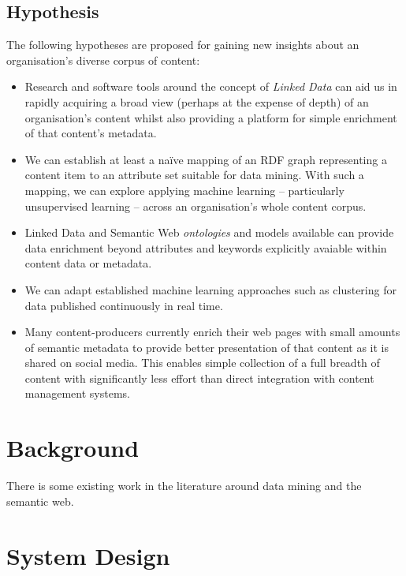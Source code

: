 \documentclass[10pt,a4paper]{report}
\begin{document}
\section{Hypothesis}

The following hypotheses are proposed for gaining new insights about an
organisation's diverse corpus of content:

\begin{itemize}

\item Research and software tools around the concept of \emph{Linked Data} can
aid us in rapidly acquiring a broad view (perhaps at the expense of depth) of an
organisation's content whilst also providing a platform for simple enrichment of
that content's metadata.

\item We can establish at least a na\"ive mapping of an RDF graph representing a
content item to an attribute set suitable for data mining. With such a mapping,
we can explore applying machine learning -- particularly unsupervised learning
-- across an organisation's whole content corpus.

\item Linked Data and Semantic Web \emph{ontologies} and models available can
provide data enrichment beyond attributes and keywords explicitly avaiable
within content data or metadata.

\item We can adapt established machine learning approaches such as clustering
for data published continuously in real time.

\item Many content-producers currently enrich their web pages with small
amounts of semantic metadata to provide better presentation of that content
as it is shared on social media. This enables simple collection of a full
breadth of content with significantly less effort than direct integration
with content management systems.

\end{itemize}

\chapter{Background}

There is some existing work in the literature around data mining and the
semantic web.

\chapter{System Design}
\end{document}
